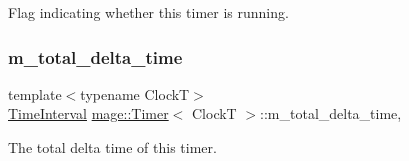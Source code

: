 Flag indicating whether this timer is running. \mbox{\label{classmage_1_1_timer_aa62b280ee2b58a3f75440cc4faf10b23}} 
\subsubsection{\texorpdfstring{m\+\_\+total\+\_\+delta\+\_\+time}{m\_total\_delta\_time}}
{\footnotesize\ttfamily template$<$typename ClockT$>$ \\
\mbox{\hyperlink{classmage_1_1_timer_a5c0fd78ceab0110637622bd0e9b8424d}{Time\+Interval}} \mbox{\hyperlink{classmage_1_1_timer}{mage\+::\+Timer}}$<$ ClockT $>$\+::m\+\_\+total\+\_\+delta\+\_\+time\hspace{0.3cm}{\ttfamily [mutable]}, {\ttfamily [private]}}

The total delta time of this timer. 